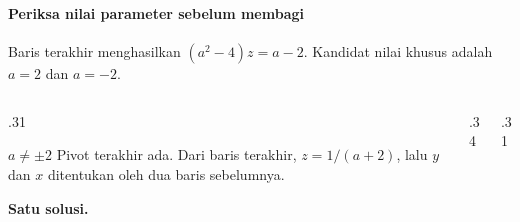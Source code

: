 \documentclass{../../kalkulus-ppt}
\begin{document}
\begin{frame}
    \frametitle{\insertsection}
    \framesubtitle{Periksa nilai parameter sebelum membagi}
    Baris terakhir menghasilkan $(a^2-4)z=a-2$. Kandidat nilai khusus adalah $a=2$ dan $a=-2$.
    \begin{columns}[T,onlytextwidth]
        \begin{column}{.31\textwidth}
            \begin{block}{$a\ne\pm2$}
                Pivot terakhir ada. Dari baris terakhir, $z=1/(a+2)$, lalu $y$ dan $x$ ditentukan oleh dua baris sebelumnya.
                \par\smallskip
                \textbf{Satu solusi.}
            \end{block}
        \end{column}
        \begin{column}{.34\textwidth}
        \end{column}
        \begin{column}{.31\textwidth}
        \end{column}
    \end{columns}
    \par\smallskip
\end{frame}
\end{document}
